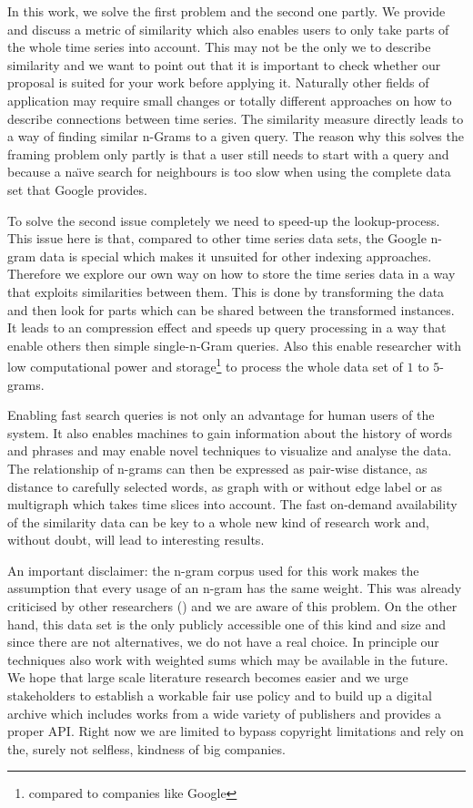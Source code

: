 In this work, we solve the first problem and the second one partly. We provide and discuss a metric of similarity which also enables users to only take parts of the whole time series into account. This may not be the only we to describe similarity and we want to point out that it is important to check whether our proposal is suited for your work before applying it. Naturally other fields of application may require small changes or totally different approaches on how to describe connections between time series. The similarity measure directly leads to a way of finding similar n-Grams to a given query. The reason why this solves the framing problem only partly is that a user still needs to start with a query and because a na{\"\i}ve search for neighbours is too slow when using the complete data set that Google provides.

To solve the second issue completely we need to speed-up the lookup-process. This issue here is that, compared to other time series data sets, the Google n-gram data is special which makes it unsuited for other indexing approaches. Therefore we explore our own way on how to store the time series data in a way that exploits similarities between them. This is done by transforming the data and then look for parts which can be shared between the transformed instances. It leads to an compression effect and speeds up query processing in a way that enable others then simple single-n-Gram queries. Also this enable researcher with low computational power and storage\footnote{compared to companies like Google} to process the whole data set of $1$ to $5$-grams.

Enabling fast search queries is not only an advantage for human users of the system. It also enables machines to gain information about the history of words and phrases and may enable novel techniques to visualize and analyse the data. The relationship of n-grams can then be expressed as pair-wise distance, as distance to carefully selected words, as graph with or without edge label or as multigraph which takes time slices into account. The fast on-demand availability of the similarity data can be key to a whole new kind of research work and, without doubt, will lead to interesting results.

An important disclaimer: the n-gram corpus used for this work makes the assumption that every usage of an n-gram has the same weight. This was already criticised by other researchers (\cite{countbad}) and we are aware of this problem. On the other hand, this data set is the only publicly accessible one of this kind and size and since there are not alternatives, we do not have a real choice. In principle our techniques also work with weighted sums which may be available in the future. We hope that large scale literature research becomes easier and we urge stakeholders to establish a workable fair use policy and to build up a digital archive which includes works from a wide variety of publishers and provides a proper API\@. Right now we are limited to bypass copyright limitations and rely on the, surely not selfless, kindness of big companies.

